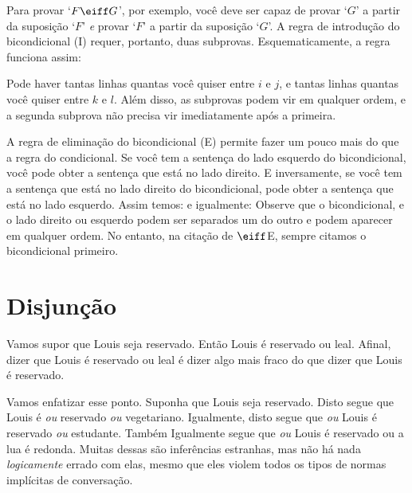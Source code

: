 Para provar `$F \eiff G$',  por exemplo, você deve ser capaz de provar `$G$' a partir da  suposição `$F$' \emph{e}  provar `$F$' a partir da suposição `$G$'. A regra de introdução do bicondicional ({\eiff}I) requer, portanto, duas subprovas.  Esquematicamente, a regra funciona assim: 

 

Pode haver tantas linhas quantas você quiser entre $i$ e $j$, e tantas linhas quantas você quiser entre $k$ e $l$.  Além disso, as subprovas podem vir em qualquer ordem, e a segunda subprova não precisa vir imediatamente após a primeira.

A regra de eliminação do bicondicional ({\eiff}E) permite fazer um pouco mais do que a regra do condicional.  Se você tem a sentença do lado esquerdo do bicondicional, você pode obter a sentença que está no lado direito. E inversamente, se você tem a sentença que está no lado direito do bicondicional, pode obter a sentença que está no lado esquerdo. Assim temos:
e igualmente:
Observe que o bicondicional, e o lado  direito ou esquerdo podem ser separados um  do outro e podem aparecer em qualquer ordem. No entanto, na citação de $\eiff$E, sempre citamos o  bicondicional primeiro.


\section{Disjunção}
Vamos supor que Louis seja reservado.  Então Louis é reservado ou leal. Afinal, dizer que Louis é reservado ou leal é dizer algo mais fraco do que dizer que Louis é reservado. 

Vamos enfatizar esse ponto. Suponha que Louis seja reservado. Disto segue que  Louis é \emph{ou} reservado \emph{ou} vegetariano.  Igualmente,  disto segue que \emph{ou} Louis   é reservado \emph{ou} estudante. Também   Igualmente segue que   \emph{ou} Louis é reservado ou a lua é redonda. Muitas dessas são inferências estranhas, mas não há nada \emph{logicamente} errado com elas, mesmo que eles violem todos os tipos de normas implícitas de conversação.


